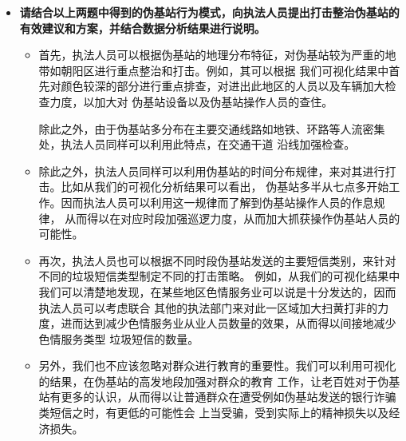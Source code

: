 \documentclass[12pt,a4paper]{article}
\begin{document}
\begin{itemize}
	\item \textbf{请结合以上两题中得到的伪基站行为模式，向执法人员提出打击整治伪基站的有效建议和方案，并结合数据分析结果进行说明。}
	
	\begin{itemize}
		\item 首先，执法人员可以根据伪基站的地理分布特征，对伪基站较为严重的地带如朝阳区进行重点整治和打击。例如，其可以根据
		我们可视化结果中首先对颜色较深的部分进行重点排查，对进出此地区的人员以及车辆加大检查力度，以加大对
		伪基站设备以及伪基站操作人员的查住。

		除此之外，由于伪基站多分布在主要交通线路如地铁、环路等人流密集处，执法人员同样可以利用此特点，在交通干道
		沿线加强检查。

		\item 除此之外，执法人员同样可以利用伪基站的时间分布规律，来对其进行打击。比如从我们的可视化分析结果可以看出，
		伪基站多半从七点多开始工作。因而执法人员可以利用这一规律而了解到伪基站操作人员的作息规律，
		从而得以在对应时段加强巡逻力度，从而加大抓获操作伪基站人员的可能性。

		\item 再次，执法人员也可以根据不同时段伪基站发送的主要短信类别，来针对不同的垃圾短信类型制定不同的打击策略。
		例如，从我们的可视化结果中我们可以清楚地发现，在某些地区色情服务业可以说是十分发达的，因而执法人员可以考虑联合
		其他的执法部门来对此一区域加大扫黄打非的力度，进而达到减少色情服务业从业人员数量的效果，从而得以间接地减少色情服务类型
		垃圾短信的数量。
		
		\item 另外，我们也不应该忽略对群众进行教育的重要性。我们可以利用可视化的结果，在伪基站的高发地段加强对群众的教育
		工作，让老百姓对于伪基站有更多的认识，从而得以让普通群众在遭受例如伪基站发送的银行诈骗类短信之时，有更低的可能性会
		上当受骗，受到实际上的精神损失以及经济损失。

	\end{itemize}

\end{itemize}
\end{document}
